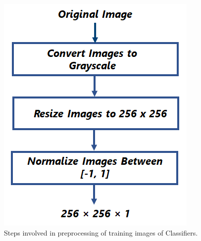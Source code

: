 \begin{figure}[H]
        \begin{center}
	    \includegraphics[scale=0.55]{images/ClassifierPreprocessing.png}
	    \caption[Steps involved in preprocessing of training images of Classifiers.]{Steps involved in preprocessing of training images of Classifiers.}
	    \label{fig:PreprocessingClassfier}
	    \end{center}
\end{figure}

